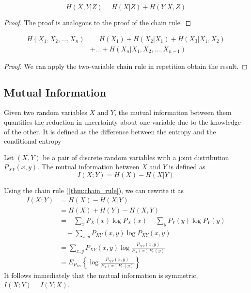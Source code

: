 \begin{corollary}
    \begin{equation}
        H(X, Y|Z) = H(X|Z) + H(Y|X,Z)
    \end{equation}
\end{corollary}
\begin{proof}
    The proof is analogous to the proof of the chain rule.
\end{proof}

\begin{corollary}
    \begin{align}
        H(X_1, X_2, \ldots, X_n) & = H(X_1) + H(X_2|X_1) + H(X_3|X_1, X_2) \nonumber \\
                                 & + \ldots + H(X_n|X_1, X_2, \ldots, X_{n-1})
    \end{align}
\end{corollary}
\begin{proof}
    We can apply the two-variable chain rule in repetition obtain the result.
\end{proof}

\subsection{Mutual Information}
Given two random variables $X$ and $Y$, the mutual information between them quantifies the reduction in uncertainty about one variable due to the knowledge of the other. It is defined as the difference between the entropy and the conditional entropy

\begin{definition}\label{def:mutual_information}
    Let $(X,Y)$ be a pair of discrete random variables with a joint distribution $P_{XY}(x,y)$. The mutual information between $X$ and $Y$ is defined as
    \begin{equation}
        I(X;Y) = H(X) - H(X|Y)
    \end{equation}
\end{definition}
\noindent Using the chain rule (\ref{thm:chain_rule}), we can rewrite it as
\begin{align}
    I(X;Y) & = H(X) - H(X|Y) \nonumber                                           \\
           & = H(X) + H(Y) - H(X,Y)                                              \\
           & = -\sum_x P_X(x)\log P_X(x) - \sum_y P_Y(y)\log P_Y(y) \nonumber    \\
           & \quad + \sum_{x,y} P_{XY}(x,y)\log P_{XY}(x,y)                      \\
           & = \sum_{x,y} P_{XY}(x,y)\log \frac{P_{XY}(x,y)}{P_X(x)P_Y(y)}       \\
           & = E_{P_{XY}} \left\{ \log \frac{P_{XY}(x,y)}{P_X(x)P_Y(y)} \right\}
\end{align}
It follows immediately that the mutual information is symmetric, $I(X;Y) = I(Y;X)$.

